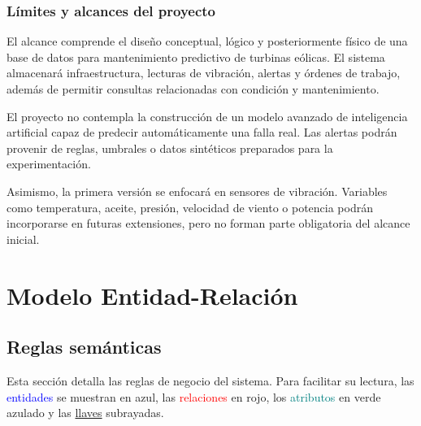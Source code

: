\documentclass[11pt,a4paper]{article}
\begin{document}
\subsubsection{Límites y alcances del proyecto}

El alcance comprende el diseño conceptual, lógico y posteriormente físico de una base
de datos para mantenimiento predictivo de turbinas eólicas. El sistema almacenará
infraestructura, lecturas de vibración, alertas y órdenes de trabajo, además de
permitir consultas relacionadas con condición y mantenimiento.

El proyecto no contempla la construcción de un modelo avanzado de inteligencia
artificial capaz de predecir automáticamente una falla real. Las alertas podrán
provenir de reglas, umbrales o datos sintéticos preparados para la experimentación.

Asimismo, la primera versión se enfocará en sensores de vibración. Variables como
temperatura, aceite, presión, velocidad de viento o potencia podrán incorporarse en
futuras extensiones, pero no forman parte obligatoria del alcance inicial.

\newpage
\section{Modelo Entidad-Relación}

\subsection{Reglas semánticas}

Esta sección detalla las reglas de negocio del sistema. Para facilitar su lectura, las
\textcolor{blue}{entidades} se muestran en azul, las \textcolor{red}{relaciones} en
rojo, los \textcolor{teal}{atributos} en verde azulado y las \underline{llaves}
subrayadas.

\par\bigskip
\end{document}
